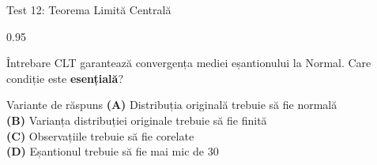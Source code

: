 \documentclass[9pt, aspectratio=169, t]{beamer}
\begin{document}
\begin{frame}{Test 12: Teorema Limită Centrală}
\begin{cminipage}{0.95\textwidth}
    \begin{alertblock}{Întrebare}
        CLT garantează convergența mediei eșantionului la Normal. Care condiție este \textbf{esențială}?
    \end{alertblock}

    \vspace{0.5cm}
    \begin{block}{Variante de răspuns}
    \textcolor{MainBlue}{\textbf{(A)}} Distribuția originală trebuie să fie normală\\[3pt]
    \textcolor{MainBlue}{\textbf{(B)}} Varianța distribuției originale trebuie să fie finită\\[3pt]
    \textcolor{MainBlue}{\textbf{(C)}} Observațiile trebuie să fie corelate\\[3pt]
    \textcolor{MainBlue}{\textbf{(D)}} Eșantionul trebuie să fie mai mic de 30
    \end{block}
\end{cminipage}
\end{frame}
\end{document}
